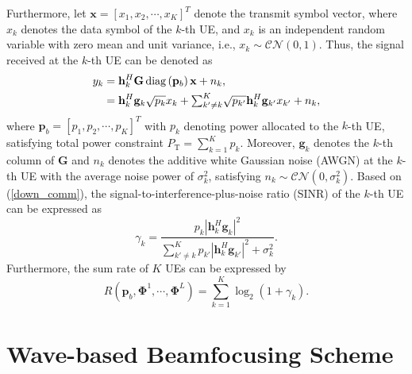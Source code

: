 \documentclass[conference]{IEEEtran}
\theoremstyle{remark}
\begin{document}
Furthermore, let $\mathbf{x}=[{x}_{1},{x}_{2},\cdots,{x}_{K}]^{T}$ denote the transmit symbol vector, where ${x}_{k}$ denotes the data symbol of the $k$-th UE,
and ${x}_{k}$ is an independent random variable with zero mean and unit 
variance, i.e., ${x}_{k}\sim\mathcal{CN}({0},1)$. Thus, the signal received at the $k$-th UE can be denoted as 
\begin{align}\label{down_comm}
{y}_{k} &=\mathbf{h}^{H}_{k}\mathbf{G}\operatorname{diag}\left(\mathbf{p}_{b}\right){\mathbf{x} }+ {n}_{k}, \notag\\
&={\mathbf{h}^{H}_{k}{\mathbf{g}_{k}} \sqrt{{p}_{k}}{{x}_{k} }}+ { {\textstyle \sum_{k' \neq k}^{K}} \sqrt{p_{k'}} \mathbf{h}^{H}_{k} {\mathbf{g}_{k'}} x_{k'}} +{{n}_{k}} ,
\end{align}
where $\mathbf{p}_{b}=[{p}_{1},{p}_{2},\cdots, {p}_{K}]^T$ with $p_{k}$ denoting power allocated to the $k$-th UE, satisfying total power constraint ${P}_{\text{T}}= {\textstyle \sum_{k=1}^{K}}{p}_{k}$.
Moreover, ${\mathbf{g}_{k}}$ denotes the $k$-th column of $\mathbf{G}$ and
${n}_{k}$ denotes the additive white Gaussian noise (AWGN) at the $k$-th UE with the average noise power of ${\sigma^2_{k}}$, satisfying ${{n}_{k}} \sim\mathcal{CN}({0},{\sigma^2_{k}})$. 
Based on (\ref{down_comm}), the signal-to-interference-plus-noise ratio (SINR) of the $k$-th UE can be expressed as 
\begin{equation}\label{SINR}
\gamma_{k}=\frac{{{p}_{k}}\left | \mathbf{h}^{H}_{k}{\mathbf{g}_{k}} \right |^2 }
{\sum_{k'\neq k}^{K} {p_{k'}}\left | \mathbf{h}^{H}_{k} {\mathbf{g}_{k'}}\right |^2 +\sigma^2_{k}}.
\end{equation}
Furthermore, the sum rate of $K$ UEs can be expressed by
\begin{equation}
R\left(\mathbf{p}_{b}, \mathbf{\Phi}^{1},\cdots,\mathbf{\Phi}^{L} \right)= {\textstyle \sum_{k=1}^{K}}\log_{2}\left(1+\gamma_{k} \right).
\end{equation}

\section{Wave-based Beamfocusing Scheme}\label{Sec_III}
\end{document}
